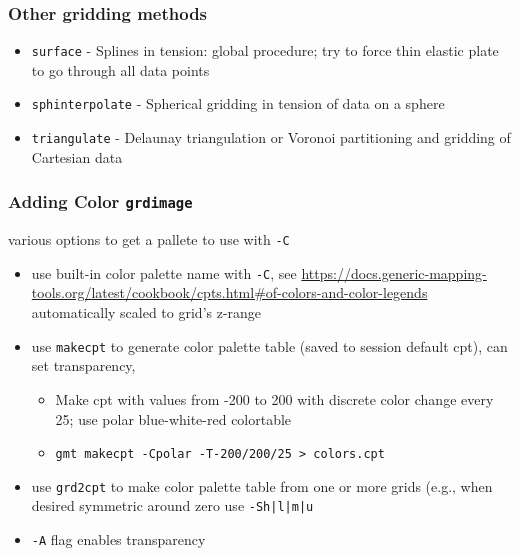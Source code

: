 \documentclass[unknownkeysallowed]{beamer}
\begin{document}
\begin{frame}[fragile=singleslide]
\frametitle{Other gridding methods}
	\begin{itemize}
		\item {\tt surface} - Splines in tension: global procedure; try to force thin elastic plate to go through all data points
		\item {\tt sphinterpolate} - Spherical gridding in tension of data on a sphere
		\item {\tt triangulate} - Delaunay triangulation or Voronoi partitioning and gridding of Cartesian data
	\end{itemize}
\end{frame}

\begin{frame}[fragile=singleslide]
\frametitle{Adding Color {\tt grdimage}}
	various options to get a pallete to use with {\tt -C}
	\begin{itemize}
		\item use built-in color palette name with {\tt -C}, see \url{https://docs.generic-mapping-tools.org/latest/cookbook/cpts.html#of-colors-and-color-legends} automatically scaled to grid's z-range
		\item use {\tt makecpt} to generate color palette table (saved to session default cpt), can set transparency, 
			\begin{itemize}
				\item Make cpt with values from -200 to 200 with discrete color change every 25; use polar blue-white-red colortable
				\item {\scriptsize {\tt gmt makecpt -Cpolar -T-200/200/25 > colors.cpt}}
			\end{itemize}
		\item use {\tt grd2cpt} to make color palette table from one or more grids (e.g., when desired symmetric around zero use {\tt -Sh|l|m|u}
		\item {\tt -A} flag enables transparency
	\end{itemize}	
\end{frame}
\end{document}
